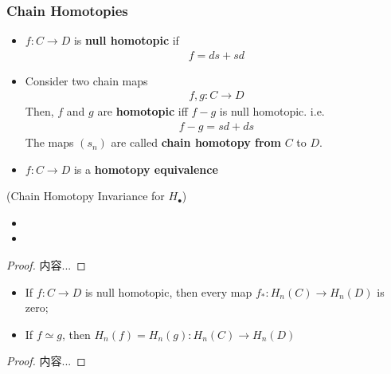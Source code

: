 \documentclass[Total.tex]{subfiles}
\begin{document}
				\subsubsection{Chain Homotopies}
					\begin{Def}
						\begin{itemize}
							\item $f:C\rightarrow D$ is \textbf{null homotopic} if
							\begin{gather*}
								f=ds+sd
							\end{gather*}
							\item Consider two chain maps 
							\begin{gather*}
								f,g:C\rightarrow D
							\end{gather*}
							Then, $f$ and $g$ are \textbf{homotopic} iff $f-g$ is null homotopic. i.e.
							\begin{gather*}
								f-g=sd+ds
							\end{gather*}
							The maps $(s_n)$ are called \textbf{chain homotopy from} $C$ to $D$. 
							\item $f:C\rightarrow D$ is a \textbf{homotopy equivalence}
						\end{itemize}
					\end{Def}
					
					\begin{lemma}
						(Chain Homotopy Invariance for $H_\bullet$)  
						\begin{itemize}
							\item 
							\item 
						\end{itemize} 
					\end{lemma}
					\begin{proof}
						内容...
					\end{proof}
					
					\begin{proposition}
						\begin{itemize}
							\item 	If $f:C\rightarrow D$ is null homotopic, then every map $f_*:H_n(C)\rightarrow H_n(D)$ is zero;
							\item If $f\simeq g$, then $H_n(f)=H_n(g):H_n(C)\rightarrow H_n(D)$
						\end{itemize}
					\end{proposition}
					\begin{proof}
						内容...
					\end{proof}
\end{document}
